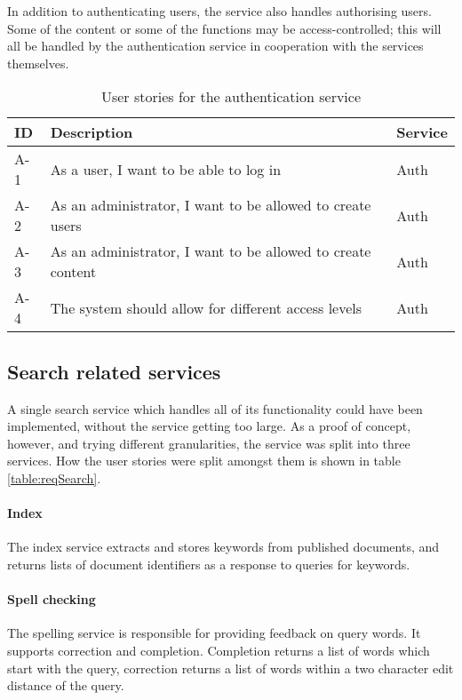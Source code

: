 In addition to authenticating users, the service also handles authorising users. Some of the content or some of the functions may be access-controlled; this will all be handled by the authentication service in cooperation with the services themselves.

\begin{table}[H]
   \caption{User stories for the authentication service}
   \centering
   \label{table:reqAuth}
   \begin{tabular}{|p{1.3cm}|p{9.5cm}|p{4cm}|}\hline%
        ID & Description & Service\\\hline\hline
        
        A-1 & As a user, I want to be able to log in & Auth \\ \hline
        A-2 & As an administrator, I want to be allowed to create users & Auth \\ \hline
        A-3 & As an administrator, I want to be allowed to create content & Auth \\ \hline
        A-4 & The system should allow for different access levels & Auth \\ \hline
    \end{tabular}
\end{table}

\subsection{Search related services}
A single search service which handles all of its functionality could have been implemented, without the service getting too large. As a proof of concept, however, and trying different granularities, the service was split into three services. How the user stories were split amongst them is shown in table \ref{table:reqSearch}.

\paragraph{Index}
The index service extracts and stores keywords from published documents, and returns lists of document identifiers as a response to queries for keywords. 

\paragraph{Spell checking}
The spelling service is responsible for providing feedback on query words. It supports correction and completion. Completion returns a list of words which start with the query, correction returns a list of words within a two character edit distance of the query.

